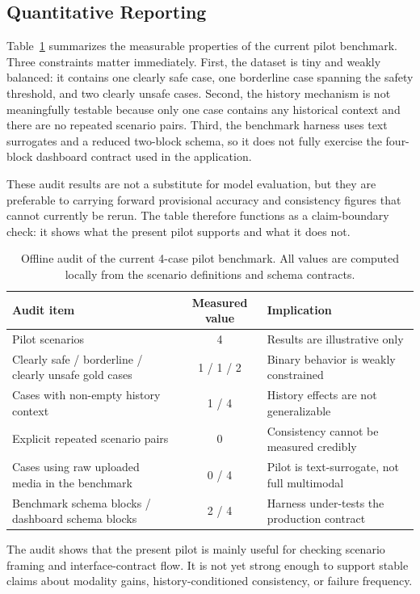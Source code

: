 \documentclass[conference]{IEEEtran}
\begin{document}
\subsection{Quantitative Reporting}
Table~\ref{tab:ablation} summarizes the measurable properties of the current pilot benchmark. Three constraints matter immediately. First, the dataset is tiny and weakly balanced: it contains one clearly safe case, one borderline case spanning the safety threshold, and two clearly unsafe cases. Second, the history mechanism is not meaningfully testable because only one case contains any historical context and there are no repeated scenario pairs. Third, the benchmark harness uses text surrogates and a reduced two-block schema, so it does not fully exercise the four-block dashboard contract used in the application.

These audit results are not a substitute for model evaluation, but they are preferable to carrying forward provisional accuracy and consistency figures that cannot currently be rerun. The table therefore functions as a claim-boundary check: it shows what the present pilot supports and what it does not.

\begin{table}[t]
\caption{Offline audit of the current 4-case pilot benchmark. All values are computed locally from the scenario definitions and schema contracts.}
\label{tab:ablation}
\centering
\footnotesize
\begin{tabularx}{\textwidth}{@{}l c X@{}}
\toprule
Audit item & Measured value & Implication \\
\midrule
Pilot scenarios & 4 & Results are illustrative only \\
Clearly safe / borderline / clearly unsafe gold cases & 1 / 1 / 2 & Binary behavior is weakly constrained \\
Cases with non-empty history context & 1 / 4 & History effects are not generalizable \\
Explicit repeated scenario pairs & 0 & Consistency cannot be measured credibly \\
Cases using raw uploaded media in the benchmark & 0 / 4 & Pilot is text-surrogate, not full multimodal \\
Benchmark schema blocks / dashboard schema blocks & 2 / 4 & Harness under-tests the production contract \\
\bottomrule
\end{tabularx}
\end{table}

\noindent The audit shows that the present pilot is mainly useful for checking scenario framing and interface-contract flow. It is not yet strong enough to support stable claims about modality gains, history-conditioned consistency, or failure frequency.
\end{document}

